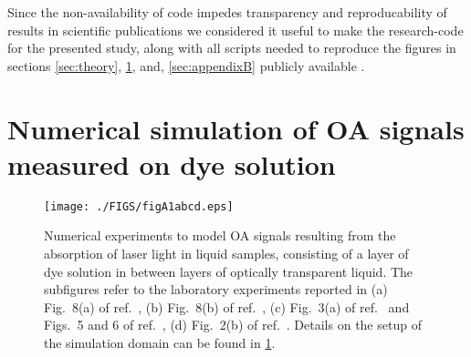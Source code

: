 \documentclass[12pt]{iopart}
\begin{document}
Since the non-availability of code impedes transparency and reproducability of
results in scientific publications \cite{Barnes:2010,Ince:2012,Sandve:2013} we
considered it useful to make the research-code for the presented study, along
with all scripts needed to reproduce the figures in sections \ref{sec:theory},
\ref{sec:appendixA}, and, \ref{sec:appendixB} publicly available
\cite{Melchert_GitHub_PCPI:2016}.


\appendix
\section{Numerical simulation of OA signals measured on dye solution}
\label{sec:appendixA}

\begin{figure}[t!]
\centerline{\texttt{[image: ./FIGS/figA1abcd.eps]}} 
\caption{Numerical experiments to model OA signals resulting from the
absorption of laser light in liquid samples, consisting of a layer of dye
solution in between layers of optically transparent liquid. The subfigures
refer to the laboratory experiments reported in (a) Fig.\ 8(a) of ref.\
\cite{Paltauf:2000}, (b) Fig.\ 8(b) of ref.\ \cite{Paltauf:2000}, (c) Fig.\
3(a) of ref.\ \cite{Paltauf:1996} and Figs.\ 5 and 6 of ref.\
\cite{Paltauf:1997}, (d) Fig.\ 2(b) of ref.\ \cite{Jaeger:2005}. Details on the
setup of the simulation domain can be found in \ref{sec:appendixA}.}
\label{fig:useCase}
\end{figure}
\end{document}
